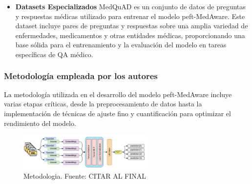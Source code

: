\begin{itemize}
				\item \textbf{Datasets Especializados}
			MedQuAD es un conjunto de datos de preguntas y respuestas médicas utilizado para entrenar el modelo peft-MedAware. Este dataset incluye pares de preguntas y respuestas sobre una amplia variedad de enfermedades, medicamentos y otras entidades médicas, proporcionando una base sólida para el entrenamiento y la evaluación del modelo en tareas específicas de QA médico.
		
		\end{itemize}


\subsubsection{Metodología empleada por los autores}

	La metodología utilizada en el desarrollo del modelo peft-MedAware incluye varias etapas críticas, desde la preprocesamiento de datos hasta la implementación de técnicas de ajuste fino y cuantificación para optimizar el rendimiento del modelo.
	
	\begin{figure}[h]
		\begin{center}
			\includegraphics[width=0.6\textwidth]{2/1_antecedentes/Metodologia1- 2.png}
		\caption{Metodologia. Fuente: CITAR AL FINAL }
	\end{center}
	\end{figure}
	
